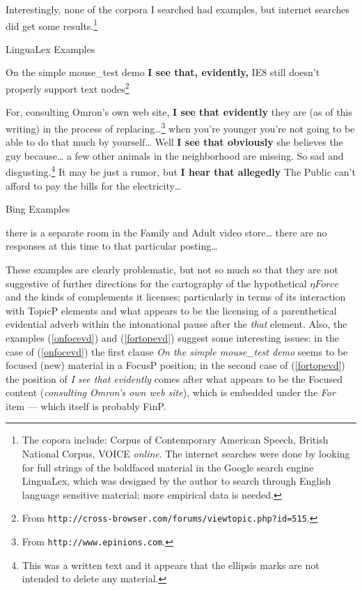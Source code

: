 \documentclass[11pt]{article}
\begin{document}
Interestingly, none of the corpora I searched had examples, but internet searches did get some results.\footnote{ The copora include: Corpus of Contemporary American Speech, British National Corpus, VOICE {\sl online}. The internet searches were done by looking for full strings of the boldfaced material in the Google search engine LinguaLex, which was designed by the author to search through English language sensitive material; more empirical data is needed.} 

\begin{exe} 
\ex LinguaLex Examples
\begin{xlist}
\ex On the simple mouse\_test demo {\bf I see that, evidently,} IE8 still doesn't properly support text nodes\footnote{From \texttt{http://cross-browser.com/forums/viewtopic.php?id=515}.}\label{onfocevd}

\ex For, consulting Omron's own web site, {\bf I see that evidently} they are (as of this writing) in the process of replacing\ldots\footnote{From \texttt{http://www.epinions.com}.}\label{fortopevd}
 when you're younger you're not going to be able to do that much by yourself\ldots
\ex Well {\bf I see that obviously} she believes the guy because\ldots
{}a few other animals in the neighborhood are missing. So sad and disgusting.\footnote{This was a written text and it appears that the ellipsis marks are not intended to delete any material.}
\ex It may be just a rumor, but {\bf I hear that allegedly} The Public can't afford to pay the bills for the electricity\ldots
\end{xlist}
\end{exe}


\begin{exe}
\ex Bing Examples
\begin{xlist}   
 there is a separate room in the Family and Adult video store\ldots
{} there are no responses at this time to that particular posting\ldots 
\end{xlist}  
\end{exe}

These examples are clearly problematic, but not so much so that they are not suggestive of further directions for the cartography of the hypothetical $\eta Force$ and the kinds of complements it licenses; particularly in terms of its interaction with TopicP elements and what appears to be the licensing of a parenthetical evidential adverb within the intonational pause after the {\sl that} element. Also, the examples (\ref{onfocevd}) and (\ref{fortopevd}) suggest some interesting issues: in the case of (\ref{onfocevd}) the first clause {\sl On the simple mouse\_test demo} seems to be focused (new) material in a FocusP position; in the second case of (\ref{fortopevd}) the position of {\sl I see that evidently} comes after what appears to be the Focused content ({\sl consulting Omron's own web site}), which is embedded under the {\sl For} item --- which itself is probably FinP. 
\end{document}
